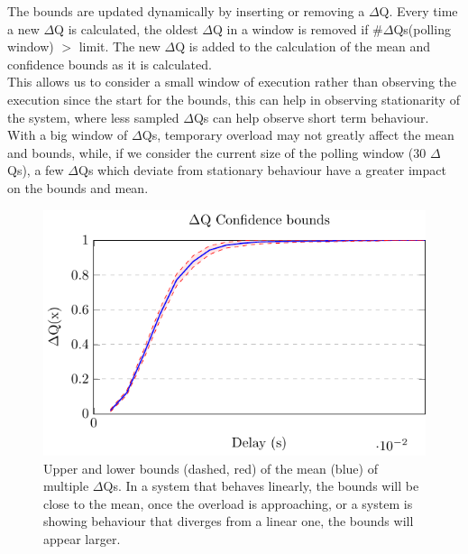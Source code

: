     The bounds are updated dynamically by inserting or removing a $\Delta$Q. Every time a new $\Delta$Q is calculated, the oldest $\Delta$Q in a window is removed if \#$\Delta$Qs(polling window) $>$ limit. The new $\Delta$Q is added to the calculation of the mean and confidence bounds as it is calculated. \\
    This allows us to consider a small window of execution rather than observing the execution since the start for the bounds, this can help in observing stationarity of the system, where less sampled $\Delta$Qs can help observe short term behaviour. \\
    With a big window of $\Delta$Qs, temporary overload may not greatly affect the mean and bounds, while, if we consider the current size of the polling window (30 $\Delta$Qs), a few $\Delta$Qs which deviate from stationary behaviour have a greater impact on the bounds and mean.
        \begin{figure}[H]
            \begin{center}
                \includegraphics[scale=1]{tikz/ci.pdf} 
            \end{center}
            \caption{Upper and lower bounds (dashed, red) of the mean (blue) of multiple $\Delta$Qs. In a system that behaves linearly, the bounds will be close to the mean, once the overload is approaching, or a system is showing behaviour that diverges from a linear one, the bounds will appear larger.}
        \end{figure}

  
